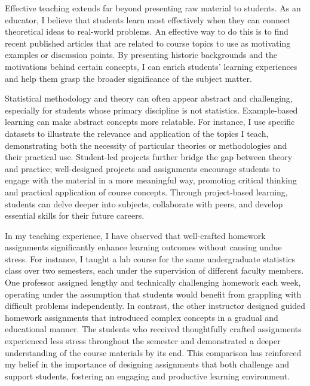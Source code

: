 \documentclass{article}
\begin{document}
Effective teaching extends far beyond presenting raw material to students.
As an educator, I believe that students learn most effectively when they can connect theoretical ideas to real-world problems.
An effective way to do this is to find recent published articles that are related to course topics to use as motivating examples or discussion points.
By presenting historic backgrounds and the motivations behind certain concepts, I can enrich students' learning experiences and help them grasp the broader significance of the subject matter.

Statistical methodology and theory can often appear abstract and challenging, especially for students whose primary discipline is not statistics.
Example-based learning can make abstract concepts more relatable.
For instance, I use specific datasets to illustrate the relevance and application of the topics I teach, demonstrating both the necessity of particular theories or methodologies and their practical use.
Student-led projects further bridge the gap between theory and practice; well-designed projects and assignments encourage students to engage with the material in a more meaningful way, promoting critical thinking and practical application of course concepts.
Through project-based learning, students can delve deeper into subjects, collaborate with peers, and develop essential skills for their future careers.

In my teaching experience, I have observed that well-crafted homework assignments significantly enhance learning outcomes without causing undue stress.
For instance, I taught a lab course for the same undergraduate statistics class over two semesters, each under the supervision of different faculty members.
One professor assigned lengthy and technically challenging homework each week, operating under the assumption that students would benefit from grappling with difficult problems independently.
In contrast, the other instructor designed guided homework assignments that introduced complex concepts in a gradual and educational manner.
The students who received thoughtfully crafted assignments experienced less stress throughout the semester and demonstrated a deeper understanding of the course materials by its end.
This comparison has reinforced my belief in the importance of designing assignments that both challenge and support students, fostering an engaging and productive learning environment.
\end{document}
